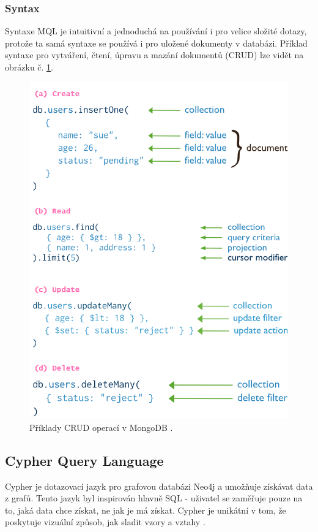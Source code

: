 \subsubsection{Syntax}
Syntaxe \gls{MQL} je intuitivní a jednoduchá na používání i pro velice složité dotazy, protože ta samá syntaxe se používá i pro uložené dokumenty v databázi. Příklad syntaxe pro vytváření, čtení, úpravu a mazání dokumentů (\gls{CRUD}) lze vidět na obrázku č. \ref{fig:crud}.
	\begin{figure}[H]
	\centering
	\includegraphics[width=12cm]{img/databaze/crud}
	\caption{Příklady \gls{CRUD} operací v MongoDB \cite{mongo_query}.}
	\label{fig:crud}
	\end{figure}

\subsection{Cypher Query Language}
Cypher je dotazovací jazyk pro grafovou databázi Neo4j a umožňuje získávat data z grafů. Tento jazyk byl inspirován hlavně \gls{SQL} - uživatel se zaměřuje pouze na to, jaká data chce získat, ne jak je má získat. Cypher je unikátní v tom, že poskytuje vizuální způsob, jak sladit vzory a vztahy \cite{cypher}.

